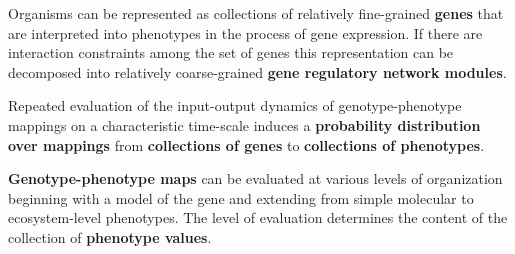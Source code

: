 \begin{frame}
\begin{block}{}
Organisms can be represented as collections of relatively fine-grained \textbf{genes} that are interpreted into phenotypes in the process of gene expression. If there are interaction constraints among the set of genes this representation can be decomposed into relatively coarse-grained \textbf{gene regulatory network modules}. 
\end{block}
\begin{block}{}
Repeated evaluation of the input-output dynamics of genotype-phenotype mappings on a characteristic time-scale induces a \textbf{probability distribution over mappings} from \textbf{collections of genes} to \textbf{collections of phenotypes}.
\end{block}
\begin{block}{}
\textbf{Genotype-phenotype maps} can be evaluated at various levels of organization beginning with a model of the gene and extending from simple molecular to ecosystem-level phenotypes. The level of evaluation determines the content of the collection of \textbf{phenotype values}.
\end{block}
\end{frame}